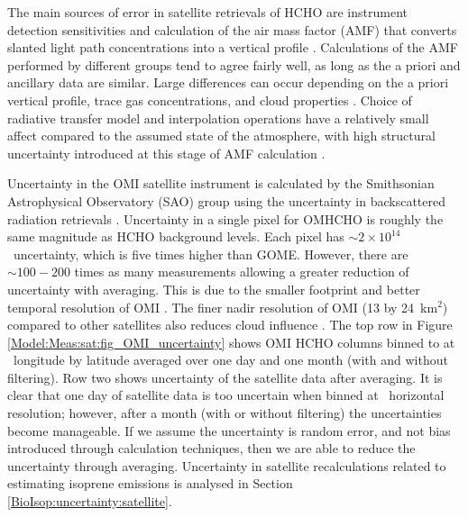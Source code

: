     The main sources of error in satellite retrievals of HCHO are instrument detection sensitivities and calculation of the air mass factor (AMF) that converts slanted light path concentrations into a vertical profile \parencite{Millet2006}.
    Calculations of the AMF performed by different groups tend to agree fairly well, as long as the a priori and ancillary data are similar.
    Large differences can occur depending on the a priori vertical profile, trace gas concentrations, and cloud properties \parencite{Lorente2017}.
    Choice of radiative transfer model and interpolation operations have a relatively small affect compared to the assumed state of the atmosphere, with high structural uncertainty introduced at this stage of AMF calculation \parencite{Lorente2017}.
    
    Uncertainty in the OMI satellite instrument is calculated by the Smithsonian Astrophysical Observatory (SAO) group using the uncertainty in backscattered radiation retrievals \parencite{Abad2015, Abad2016}.
    Uncertainty in a single pixel for OMHCHO is roughly the same magnitude as HCHO background levels.
    Each pixel has $\sim 2 \times 10^{14}$\moleccm ~uncertainty, which is five times higher than GOME.
    However, there are $\sim 100-200 $ times as many measurements allowing a greater reduction of uncertainty with averaging.
    This is due to the smaller footprint and better temporal resolution of OMI \parencite{Chance2002,Millet2008}.
    The finer nadir resolution of OMI (13 by 24~km${^2}$) compared to other satellites also reduces cloud influence \parencite{Millet2006, Millet2008}.
    The top row in Figure \ref{Model:Meas:sat:fig_OMI_uncertainty} shows OMI HCHO columns binned to at \highhr ~longitude by latitude averaged over one day and one month (with and without filtering).
    Row two shows uncertainty of the satellite data after averaging.
    It is clear that one day of satellite data is too uncertain when binned at \highhr ~horizontal resolution; however, after a month (with or without filtering) the uncertainties become manageable.
    If we assume the uncertainty is random error, and not bias introduced through calculation techniques, then we are able to reduce the uncertainty through averaging.
    Uncertainty in satellite recalculations related to estimating isoprene emissions is analysed in Section \ref{BioIsop:uncertainty:satellite}.
    
